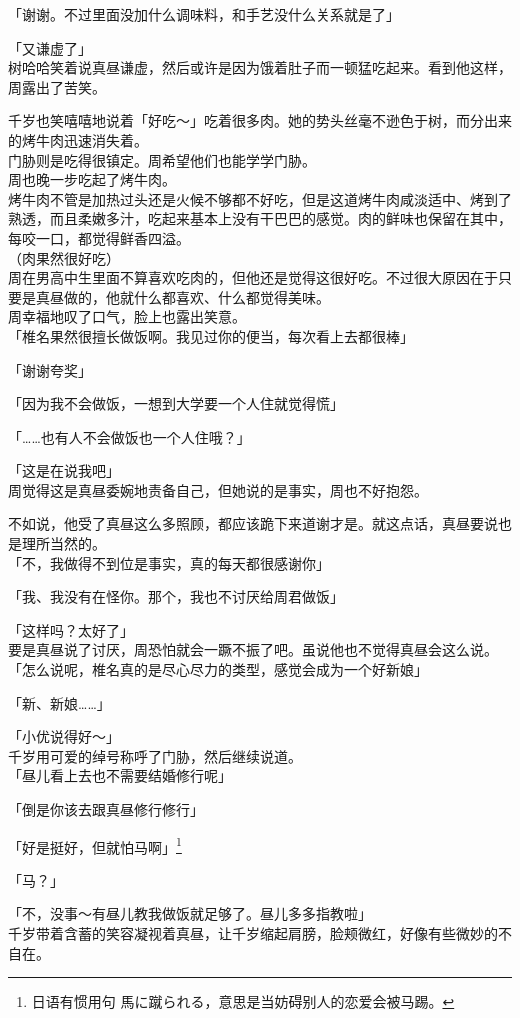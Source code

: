 「谢谢。不过里面没加什么调味料，和手艺没什么关系就是了」

「又谦虚了」\\

树哈哈笑着说真昼谦虚，然后或许是因为饿着肚子而一顿猛吃起来。看到他这样，周露出了苦笑。

千岁也笑嘻嘻地说着「好吃～」吃着很多肉。她的势头丝毫不逊色于树，而分出来的烤牛肉迅速消失着。\\

门胁则是吃得很镇定。周希望他们也能学学门胁。\\

周也晚一步吃起了烤牛肉。\\

烤牛肉不管是加热过头还是火候不够都不好吃，但是这道烤牛肉咸淡适中、烤到了熟透，而且柔嫩多汁，吃起来基本上没有干巴巴的感觉。肉的鲜味也保留在其中，每咬一口，都觉得鲜香四溢。\\

（肉果然很好吃）\\

周在男高中生里面不算喜欢吃肉的，但他还是觉得这很好吃。不过很大原因在于只要是真昼做的，他就什么都喜欢、什么都觉得美味。\\

周幸福地叹了口气，脸上也露出笑意。\\

「椎名果然很擅长做饭啊。我见过你的便当，每次看上去都很棒」

「谢谢夸奖」

「因为我不会做饭，一想到大学要一个人住就觉得慌」

「……也有人不会做饭也一个人住哦？」

「这是在说我吧」\\

周觉得这是真昼委婉地责备自己，但她说的是事实，周也不好抱怨。

不如说，他受了真昼这么多照顾，都应该跪下来道谢才是。就这点话，真昼要说也是理所当然的。\\

「不，我做得不到位是事实，真的每天都很感谢你」

「我、我没有在怪你。那个，我也不讨厌给周君做饭」

「这样吗？太好了」\\

要是真昼说了讨厌，周恐怕就会一蹶不振了吧。虽说他也不觉得真昼会这么说。\\

「怎么说呢，椎名真的是尽心尽力的类型，感觉会成为一个好新娘」

「新、新娘……」

「小优说得好～」\\

千岁用可爱的绰号称呼了门胁，然后继续说道。\\

「昼儿看上去也不需要结婚修行呢」

「倒是你该去跟真昼修行修行」

「好是挺好，但就怕马啊」\footnote{日语有惯用句 {\jpfont 馬に蹴られる}，意思是当妨碍别人的恋爱会被马踢。}

「马？」

「不，没事～有昼儿教我做饭就足够了。昼儿多多指教啦」\\

千岁带着含蓄的笑容凝视着真昼，让千岁缩起肩膀，脸颊微红，好像有些微妙的不自在。
